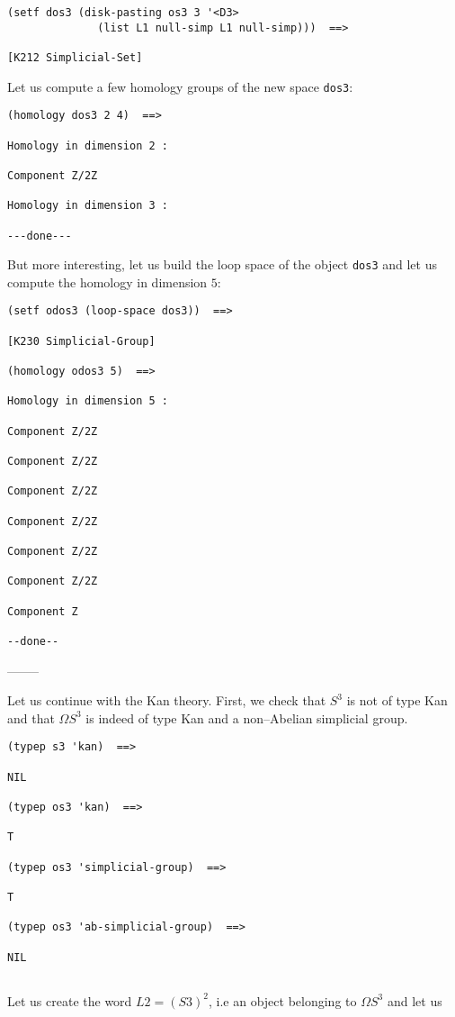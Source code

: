 {\footnotesize\begin{verbatim}
(setf dos3 (disk-pasting os3 3 '<D3> 
              (list L1 null-simp L1 null-simp)))  ==>

[K212 Simplicial-Set]
\end{verbatim}}
Let us compute a few homology groups of the new space {\tt dos3}:
{\footnotesize\begin{verbatim}
(homology dos3 2 4)  ==>

Homology in dimension 2 :

Component Z/2Z

Homology in dimension 3 :

---done---
\end{verbatim}}
But more interesting, let us  build the  loop space of the object {\tt dos3} and 
let us compute  the ho\-mo\-lo\-gy in dimension $5$:
{\footnotesize\begin{verbatim}
(setf odos3 (loop-space dos3))  ==>

[K230 Simplicial-Group]

(homology odos3 5)  ==>

Homology in dimension 5 :

Component Z/2Z

Component Z/2Z

Component Z/2Z

Component Z/2Z

Component Z/2Z

Component Z/2Z

Component Z

--done--
\end{verbatim}}
\begin{center}
--------
\end{center}
Let us continue with the Kan theory. First, we check that $S^3$ is not of type Kan and that $\Omega S^3$
is indeed of type Kan and a non--Abelian simplicial group.
{\footnotesize\begin{verbatim}
(typep s3 'kan)  ==>

NIL

(typep os3 'kan)  ==>

T

(typep os3 'simplicial-group)  ==>

T

(typep os3 'ab-simplicial-group)  ==>

NIL


\end{verbatim}}
Let us create the word $L2=(S3)^2$, i.e an object belonging to $\Omega S^3$ and let us
